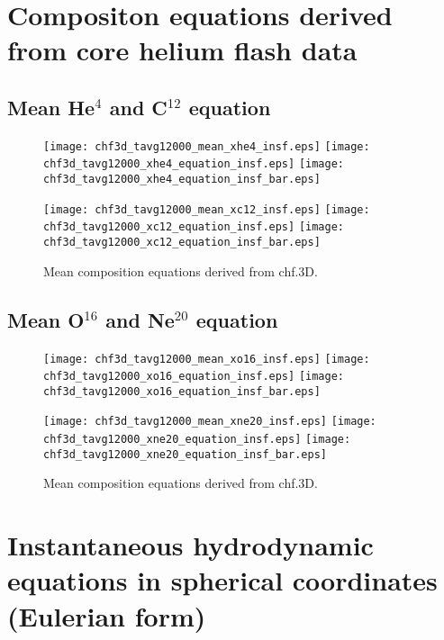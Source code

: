 \documentclass[10pt,paper=a4]{report}
\begin{document}
\newpage

\section{Compositon equations derived from core helium flash data}

\subsection{Mean He$^{4}$ and C$^{12}$ equation}

\begin{figure}[!h]
\centerline{
\texttt{[image: chf3d\_tavg12000\_mean\_xhe4\_insf.eps]}
\texttt{[image: chf3d\_tavg12000\_xhe4\_equation\_insf.eps]}
\texttt{[image: chf3d\_tavg12000\_xhe4\_equation\_insf\_bar.eps]}}

\centerline{
\texttt{[image: chf3d\_tavg12000\_mean\_xc12\_insf.eps]}
\texttt{[image: chf3d\_tavg12000\_xc12\_equation\_insf.eps]}
\texttt{[image: chf3d\_tavg12000\_xc12\_equation\_insf\_bar.eps]}}
\caption{Mean composition equations derived from {\sf chf.3D}. \label{fig:x-equations}}
\end{figure}

\newpage

\subsection{Mean O$^{16}$ and Ne$^{20}$ equation}

\begin{figure}[!h]
\centerline{
\texttt{[image: chf3d\_tavg12000\_mean\_xo16\_insf.eps]}
\texttt{[image: chf3d\_tavg12000\_xo16\_equation\_insf.eps]}
\texttt{[image: chf3d\_tavg12000\_xo16\_equation\_insf\_bar.eps]}}

\centerline{
\texttt{[image: chf3d\_tavg12000\_mean\_xne20\_insf.eps]}
\texttt{[image: chf3d\_tavg12000\_xne20\_equation\_insf.eps]}
\texttt{[image: chf3d\_tavg12000\_xne20\_equation\_insf\_bar.eps]}}
\caption{Mean composition equations derived from {\sf chf.3D}.\label{fig:x-equations}}
\end{figure}



\clearpage


\section{Instantaneous hydrodynamic equations in spherical coordinates (Eulerian form)}
\label{sect:mean-field-derivation}
\end{document}
